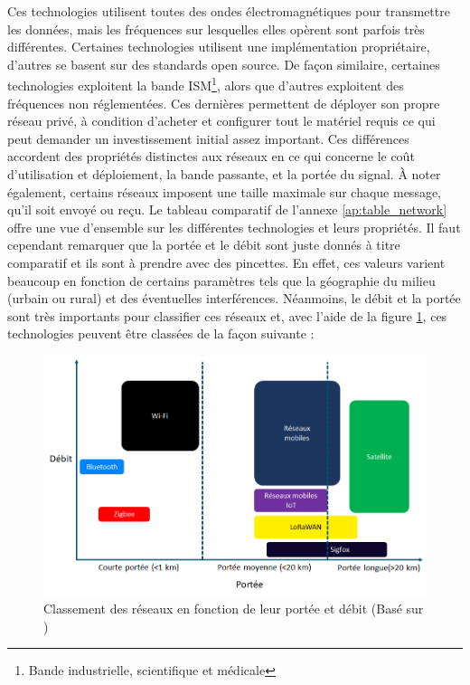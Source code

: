 \noindent
Ces technologies utilisent toutes des ondes électromagnétiques pour transmettre les données, mais les fréquences sur lesquelles elles opèrent sont parfois très différentes. Certaines technologies utilisent une implémentation propriétaire, d’autres se basent sur des standards open source. \cite{foubert_iot} De façon similaire, certaines technologies exploitent la bande ISM\footnote{Bande industrielle, scientifique et médicale}, alors que d’autres exploitent des fréquences non réglementées. Ces dernières permettent de déployer son propre réseau privé, à condition d’acheter et configurer tout le matériel requis ce qui peut demander un investissement initial assez important. Ces différences accordent des propriétés distinctes aux réseaux en ce qui concerne le coût d’utilisation et déploiement, la bande passante, et la portée du signal. À noter également, certains réseaux imposent une taille maximale sur chaque message, qu’il soit envoyé ou reçu. Le tableau comparatif de l’annexe \ref{ap:table_network} offre une vue d’ensemble sur les différentes technologies et leurs propriétés. Il faut cependant remarquer que la portée et le débit sont juste donnés à titre comparatif et ils sont à prendre avec des pincettes. En effet, ces valeurs varient beaucoup en fonction de certains paramètres tels que la géographie du milieu (urbain ou rural) et des éventuelles interférences. Néanmoins, le débit et la portée sont très importants pour classifier ces réseaux et, avec l’aide de la figure \ref{fig:range_iot}, ces technologies peuvent être classées de la façon suivante \cite{orange_iot} :


\begin{figure}
  \includegraphics[width=\textwidth]{img/state_of_the_art/range_iot.png}
  \caption{Classement des réseaux en fonction de leur portée et débit (Basé sur )}
  \label{fig:range_iot}
\end{figure}

